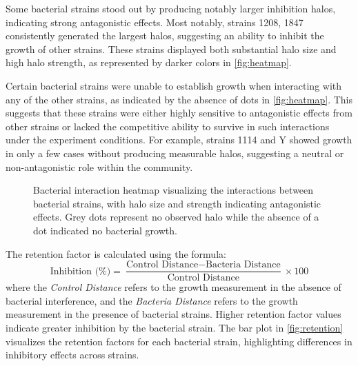 Some bacterial strains stood out by producing notably larger inhibition halos, indicating strong antagonistic effects. Most notably, strains 1208, 1847 consistently generated the largest halos, suggesting an ability to inhibit the growth of other strains. These strains displayed both substantial halo size and high halo strength, as represented by darker colors in \autoref{fig:heatmap}.

Certain bacterial strains were unable to establish growth when interacting with any of the other strains, as indicated by the absence of dots in \autoref{fig:heatmap}. This suggests that these strains were either highly sensitive to antagonistic effects from other strains or lacked the competitive ability to survive in such interactions under the experiment conditions. 
For example, strains 1114 and Y showed growth in only a few cases without producing measurable halos, suggesting a neutral or non-antagonistic role within the community.
\begin{figure}[H]
    \centering
    \setlength{\abovecaptionskip}{-30pt} %
    \makebox[\textwidth]{ %
        
    }
    \caption{Bacterial interaction heatmap visualizing the interactions between bacterial strains, with halo size and strength indicating antagonistic effects. Grey dots represent no observed halo while the absence of a dot indicated no bacterial growth.}
    \label{fig:heatmap}
\end{figure}


\vspace{0.5cm} %

\noindent
The retention factor is calculated using the formula:
\[
\text{Inhibition (\%)} = \frac{\text{Control Distance} - \text{Bacteria Distance}}{\text{Control Distance}} \times 100
\]
where the \textit{Control Distance} refers to the growth measurement in the absence of bacterial interference, and the \textit{Bacteria Distance} refers to the growth measurement in the presence of bacterial strains. Higher retention factor values indicate greater inhibition by the bacterial strain. The bar plot in \autoref{fig:retention} visualizes the retention factors for each bacterial strain, highlighting differences in inhibitory effects across strains.


